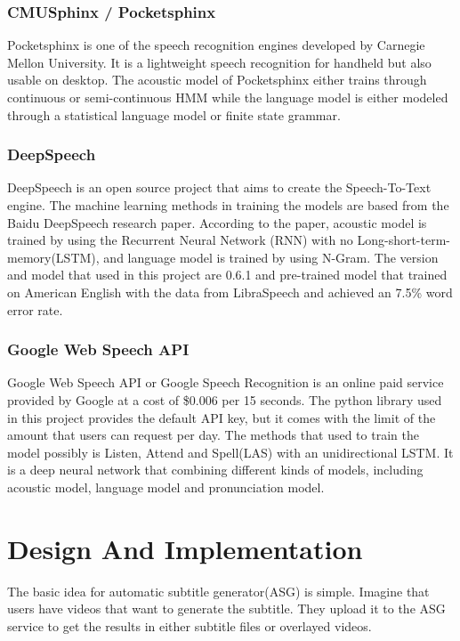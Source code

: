 \documentclass[natbib]{muthesis}
\begin{document}
  \subsection{CMUSphinx / Pocketsphinx}
  Pocketsphinx is one of the speech recognition engines developed by Carnegie Mellon University. It is a lightweight speech recognition for handheld but also usable on desktop. The acoustic model of Pocketsphinx either trains through continuous or semi-continuous HMM while the language model is either modeled through  a statistical language model or finite state grammar.\cite{PocketSphinx} 
  
  \subsection{DeepSpeech}
  DeepSpeech is an open source project that aims to create the Speech-To-Text engine. The machine learning methods in training the models are based from the Baidu DeepSpeech research paper. According to the paper, acoustic model is trained by using the Recurrent Neural Network (RNN) with no Long-short-term-memory(LSTM), and language model is trained by using N-Gram\cite{hannun2014deep}.
  The version and model that used in this project are 0.6.1 and pre-trained model that trained on American English with the data from LibraSpeech and achieved an 7.5\% word error rate. 
  \subsection{Google Web Speech API}
  Google Web Speech API or Google Speech Recognition is an online paid service provided by Google at a cost of \$0.006 per 15 seconds. The python library used in this project provides the default API key, but it comes with the limit of the amount that users can request per day. The methods that used to train the model possibly is Listen, Attend and Spell(LAS) with an unidirectional LSTM.\cite{46687} It is a deep neural network that combining different kinds of models, including acoustic model, language model and pronunciation model.
 \chapter{Design And Implementation}
 The basic idea for automatic subtitle generator(ASG) is simple. Imagine that users have videos that want to generate the subtitle. They upload it to the ASG service to get the results in either subtitle files or overlayed videos.
 
\end{document}
